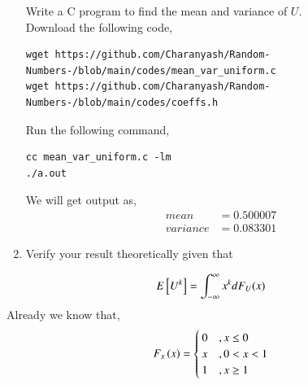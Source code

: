 \documentclass[journal,12pt,twocolumn]{IEEEtran}
\renewcommand\thesection{\arabic{section}}
\begin{document}
\begin{enumerate}[label=\thesection.\arabic*,ref=\thesection.\theenumi]
Write a C program to  find the mean and variance of $U$.\\ 
\solution Download the following code,
 \begin{lstlisting}
wget https://github.com/Charanyash/Random-Numbers-/blob/main/codes/mean_var_uniform.c
wget https://github.com/Charanyash/Random-Numbers-/blob/main/codes/coeffs.h
 \end{lstlisting}
Run the following command,
 \begin{lstlisting}
cc mean_var_uniform.c -lm
./a.out
 \end{lstlisting}
We will get output as,
\begin{align}
	mean &= 0.500007\\
  variance&= 0.083301
\end{align}
	
\item Verify your result theoretically given that
\end{enumerate}
%
\begin{equation}
E{}\left[U^k\right] = \int_{-\infty}^{\infty}x^kdF_{U}(x)
\end{equation}
\solution Already we know that,
                \begin{equation*}
                                 F_{x}\left(x\right) = \begin{cases}
                                                          0  &, x \leq 0 \\
                                                          x  &, 0<x<1 \\
                                                          1  & , x \geq 1
                                                        \end{cases}
                 \end{equation*}
\end{document}
